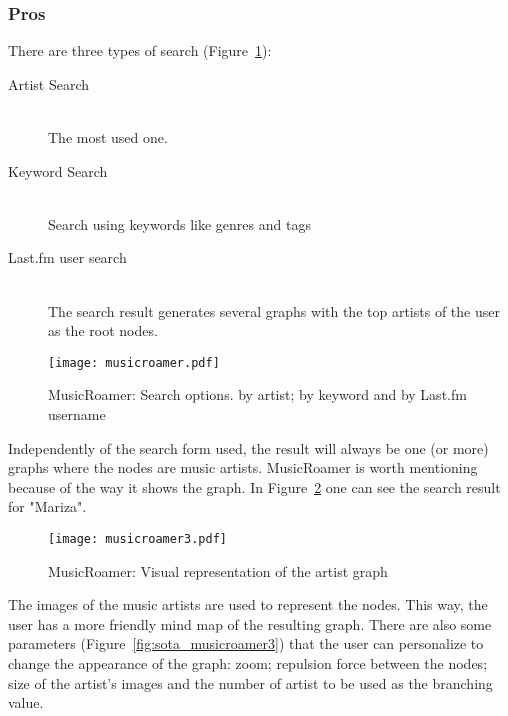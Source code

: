    \subsubsection{Pros} %
    \label{ssub:pros}

      There are three types of search (Figure~\ref{fig:sota_musicroamer}): 

      \begin{description}
        \item[Artist Search] \hfill \\
          The most used one.
        \item[Keyword Search] \hfill \\
          Search using keywords like genres and tags
        \item[Last.fm user search] \hfill \\
          The search result generates several graphs with the top artists of the user as the root nodes.
      \end{description}

      \begin{figure}[hb]
        \begin{center}
          \texttt{[image: musicroamer.pdf]}
        \end{center}
        \caption{MusicRoamer: Search options. by artist; by keyword and by Last.fm username}
        \label{fig:sota_musicroamer}
      \end{figure}

      Independently of the search form used, the result will always be one (or more) graphs where the nodes are music artists.
      MusicRoamer is worth mentioning because of the way it shows the graph.
      In Figure~\ref{fig:sota_musicroamer2} one can see the search result for "Mariza".

      \begin{figure}[H]
        \begin{center}
          \texttt{[image: musicroamer3.pdf]}
        \end{center}
        \caption{MusicRoamer: Visual representation of the artist graph}
        \label{fig:sota_musicroamer2}
      \end{figure}

      The images of the music artists are used to represent the nodes.
      This way, the user has a more friendly mind map of the resulting graph.
      There are also some parameters (Figure~\ref{fig:sota_musicroamer3}) that the user can personalize to change the appearance of the graph: zoom; repulsion force between the nodes; size of the artist's images and the number of artist to be used as the branching value.

